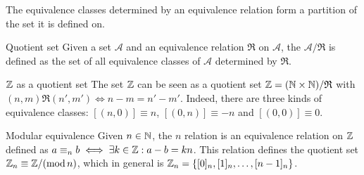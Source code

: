 The equivalence classes determined by an equivalence relation form a partition of the set it is defined on.

\begin{definition}{Quotient set}{}
  Given a set $ \mathcal{A} $ and an equivalence relation $ \mathfrak{R} $ on $ \mathcal{A} $, the  $ \mathcal{A} / \mathfrak{R} $ is defined as the set of all equivalence classes of $ \mathcal{A} $ determined by $ \mathfrak{R} $.
\end{definition}

\begin{example}{$ \mathbb{Z} $ as a quotient set}{}
  The set $ \mathbb{Z} $ can be seen as a quotient set $ \mathbb{Z} = (\mathbb{N} \times \mathbb{N}) / \mathfrak{R} $ with $ (n,m) \mathfrak{R} (n',m') \iff n - m = n' - m' $. Indeed, there are three kinds of equivalence classes: $ [(n,0)] \equiv n $, $ [(0,n)] \equiv -n $ and $ [(0,0)] \equiv 0 $.
\end{example}

\begin{example}{Modular equivalence}{}
  Given $ n \in \mathbb{N} $, the  $ n $ relation is an equivalence relation on $ \mathbb{Z} $ defined as $ a \equiv_n b \iff \exists k \in \mathbb{Z} : a - b = k n $. This relation defines the quotient set $ \mathbb{Z}_n \equiv \mathbb{Z} / (\mathrm{mod}\, n) $, which in general is $ \mathbb{Z}_n = \{[0]_n, [1]_n, \dots, [n-1]_n\} $.
\end{example}










